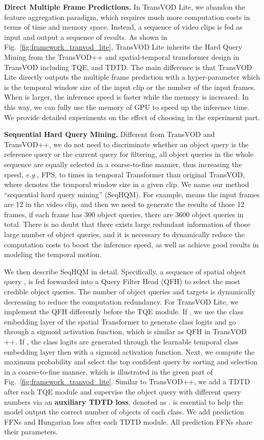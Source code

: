 \documentclass[10pt,journal,compsoc]{IEEEtran}
\begin{document}
\noindent
\textbf{Direct Multiple Frame Predictions.} In TransVOD Lite, we abandon the feature aggregation paradigm, which requires much more computation costs in terms of time and memory space. Instead, a sequence of video clips is fed as input and output a sequence of results. 
As shown in Fig.~\ref{fig:framework_tranvod_lite}, TransVOD Lite inherits the Hard Query Mining from the TransVOD++ and spatial-temporal transformer design in TransVOD including TQE, and TDTD. The main difference is that TransVOD Lite directly outputs the multiple frame prediction with a hyper-parameter  which is the temporal window size of the input clip or the number of the input frames. When  is larger, the inference speed is faster while the memory is increased. In this way, we can fully use the memory of GPU to speed up the inference time. We provide detailed experiments on the effect of choosing  in the experiment part.

\noindent
\textbf{Sequential Hard Query Mining.} 
Different from TransVOD and TransVOD++, we do not need to discriminate whether an object query is the reference query or the current query for filtering, all object queries in the whole sequence are equally selected in a coarse-to-fine manner, thus increasing the speed, \emph{e.g.,} FPS, to  times in temporal Transformer than original TransVOD, where  denotes the temporal window size in a given clip.
We name our method ``sequential hard query mining'' (SeqHQM).
For example,  means the input frames are 12 in the video clip, and then we need to generate the results of those 12 frames, if each frame has 300 object queries, there are 3600 object queries in total. There is no doubt that there exists large redundant information of those large number of object queries, and it is necessary to dynamically reduce the computation costs to boost the inference speed, as well as achieve good results in modeling the temporal motion.

We then describe SeqHQM in detail. Specifically, a sequence of spatial object query , is fed forwarded into a Query Filter Head (QFH) to select the most credible object queries. The number of object queries and targets is dynamically decreasing to reduce the computation redundancy. For TransVOD Lite, we implement the QFH differently before the  TQE module. If , we use the class embedding layer of the spatial Transformer to generate class logits and go through a sigmoid activation function, which is similar as QFH in TransVOD ++. If , the class logits are generated through the learnable temporal class embedding layer then with a sigmoid activation function. Next, we compute the maximum probability and select the top  confident query by sorting and selection in a coarse-to-fine manner, which is illustrated in the green part of Fig.~\ref{fig:framework_tranvod_lite}.
Similar to TransVOD++, we add a TDTD after each TQE module and supervise the object query with different query numbers via an \textbf{auxiliary TDTD loss}, denoted as .   is essential to help the model output the correct number of objects of each class. We add prediction FFNs and Hungarian loss after each TDTD module. All prediction FFNs share their parameters. 
\end{document}
